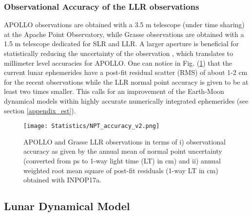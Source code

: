 \documentclass[fleqn,usenatbib,referee]{mnras}
\begin{document}
      \subsubsection{Observational Accuracy of the LLR observations}
      \label{accuracy}
      APOLLO observations are obtained with a 3.5 m telescope (under time sharing) at the Apache Point Observatory, while Grasse observations are obtained with a 1.5 m telescope dedicated for SLR and LLR. A larger aperture is beneficial for statistically reducing the uncertainty of the observation \cite[]{Murphy2013a}, which translates to millimeter level accuracies for APOLLO. One can notice in Fig. (\ref{NPT_accuracy}) that the current lunar ephemerides have a post-fit residual scatter (RMS) of about 1-2 cm for the recent observations while the LLR normal point accuracy is given to be at least two times smaller. This calls for an improvement of the Earth-Moon dynamical models within highly accurate numerically integrated ephemerides (see section \ref{appendix_est}). 

      \begin{figure}
      \centering
      \texttt{[image: Statistics/NPT\_accuracy\_v2.png]}
      \caption{APOLLO and Grasse LLR observations in terms of i) observational accuracy as given by the annual mean of normal point uncertainty (converted from ps to 1-way light time (LT) in cm) and ii) annual weighted root mean square of post-fit residuals (1-way LT in cm) obtained with INPOP17a.}
      \label{NPT_accuracy}
      \end{figure}

\subsection{Lunar Dynamical Model}
  \label{dynmodel}
\end{document}
